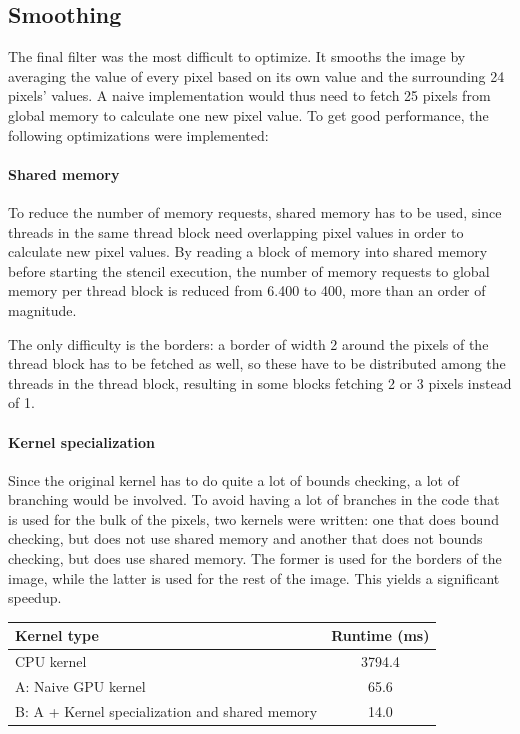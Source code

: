 \documentclass[11pt,a4paper]{article}
\begin{document}
\subsection{Smoothing}

The final filter was the most difficult to optimize. It smooths the image by averaging the value of every pixel based on its own value and the surrounding 24 pixels' values. A naive implementation would thus need to fetch 25 pixels from global memory to calculate one new pixel value. To get good performance, the following optimizations were implemented:

\paragraph{Shared memory}
To reduce the number of memory requests, shared memory has to be used, since threads in the same thread block need overlapping pixel values in order to calculate new pixel values. By reading a block of memory into shared memory before starting the stencil execution, the number of memory requests to global memory per thread block is reduced from 6.400 to 400, more than an order of magnitude.

The only difficulty is the borders: a border of width 2 around the pixels of the thread block has to be fetched as well, so these have to be distributed among the threads in the thread block, resulting in some blocks fetching 2 or 3 pixels instead of 1.

\paragraph{Kernel specialization}
Since the original kernel has to do quite a lot of bounds checking, a lot of branching would be involved. To avoid having a lot of branches in the code that is used for the bulk of the pixels, two kernels were written: one that does bound checking, but does not use shared memory and another that does not bounds checking, but does use shared memory. The former is used for the borders of the image, while the latter is used for the rest of the image. This yields a significant speedup. \\

\begin{tabular}{ | l | S | }
	\hline
	\textbf{Kernel type} & \textbf{Runtime (ms)} \\
	\hline                       
	CPU kernel & 3794.4 \\
	\hline
	A: Naive GPU kernel & 65.6 \\
	\hline
	B: A + Kernel specialization and shared memory & 14.0 \\
	\hline
\end{tabular} \\
\end{document}
